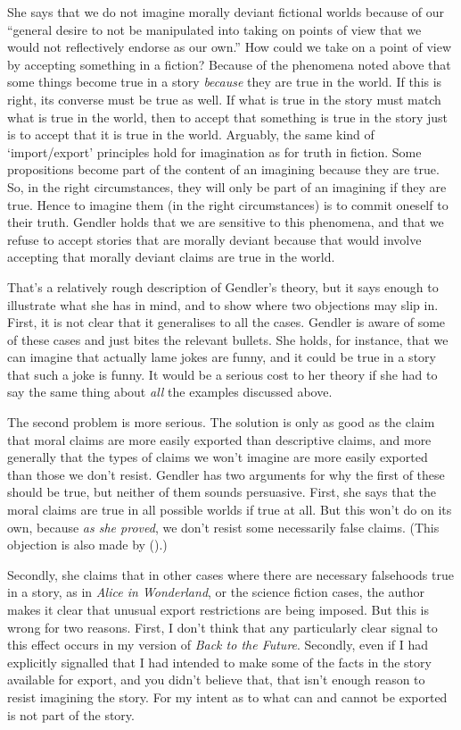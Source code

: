 \documentclass[
  10pt,
  letterpaper,
  DIV=11,
  numbers=noendperiod,
  twoside]{scrartcl}
\begin{document}
She says that we do not imagine morally deviant fictional worlds because
of our ``general desire to not be manipulated into taking on points of
view that we would not reflectively endorse as our own.'' How could we
take on a point of view by accepting something in a fiction? Because of
the phenomena noted above that some things become true in a story
\emph{because} they are true in the world. If this is right, its
converse must be true as well. If what is true in the story must match
what is true in the world, then to accept that something is true in the
story just is to accept that it is true in the world. Arguably, the same
kind of `import/export' principles hold for imagination as for truth in
fiction. Some propositions become part of the content of an imagining
because they are true. So, in the right circumstances, they will only be
part of an imagining if they are true. Hence to imagine them (in the
right circumstances) is to commit oneself to their truth. Gendler holds
that we are sensitive to this phenomena, and that we refuse to accept
stories that are morally deviant because that would involve accepting
that morally deviant claims are true in the world.

That's a relatively rough description of Gendler's theory, but it says
enough to illustrate what she has in mind, and to show where two
objections may slip in. First, it is not clear that it generalises to
all the cases. Gendler is aware of some of these cases and just bites
the relevant bullets. She holds, for instance, that we can imagine that
actually lame jokes are funny, and it could be true in a story that such
a joke is funny. It would be a serious cost to her theory if she had to
say the same thing about \emph{all} the examples discussed above.

The second problem is more serious. The solution is only as good as the
claim that moral claims are more easily exported than descriptive
claims, and more generally that the types of claims we won't imagine are
more easily exported than those we don't resist. Gendler has two
arguments for why the first of these should be true, but neither of them
sounds persuasive. First, she says that the moral claims are true in all
possible worlds if true at all. But this won't do on its own, because
\emph{as she proved}, we don't resist some necessarily false claims.
(This objection is also made by ().)

Secondly, she claims that in other cases where there are necessary
falsehoods true in a story, as in \emph{Alice in Wonderland}, or the
science fiction cases, the author makes it clear that unusual export
restrictions are being imposed. But this is wrong for two reasons.
First, I don't think that any particularly clear signal to this effect
occurs in my version of \emph{Back to the Future}. Secondly, even if I
had explicitly signalled that I had intended to make some of the facts
in the story available for export, and you didn't believe that, that
isn't enough reason to resist imagining the story. For my intent as to
what can and cannot be exported is not part of the story.
\end{document}
